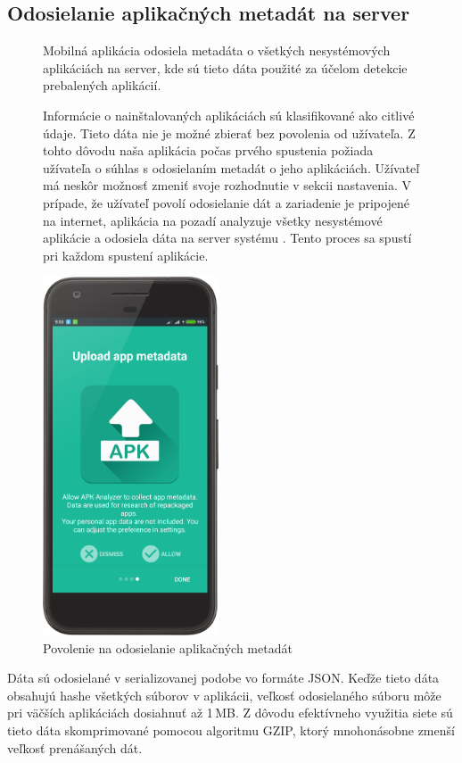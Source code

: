 \subsection{Odosielanie aplikačných metadát na server}
\begin{figure}[H]
\begin{minipage}[t]{0.48\textwidth}
Mobilná aplikácia odosiela metadáta o všetkých nesystémových aplikáciách na server, kde sú tieto dáta použité za účelom detekcie prebalených aplikácií.

Informácie o nainštalovaných aplikáciách sú klasifikované ako citlivé údaje. Tieto dáta nie je možné zbierať bez povolenia od užívateľa. Z tohto dôvodu naša aplikácia počas prvého spustenia požiada užívateľa o súhlas s odosielaním metadát o jeho aplikáciách. Užívateľ má neskôr možnosť zmeniť svoje rozhodnutie v sekcii nastavenia.
V prípade, že užívateľ povolí odosielanie dát a zariadenie je pripojené na internet, aplikácia na pozadí analyzuje všetky nesystémové aplikácie a odosiela dáta na server systému . Tento proces sa spustí pri každom spustení aplikácie.
\end{minipage}%
\hfill
\centering
\begin{minipage}[t][][b]{0.45\textwidth}
\centering
    \includegraphics[width=5.2cm]{images/app/upload_device.png}
\centering
\caption{Povolenie na odosielanie aplikačných metadát}
\label{fig:upload-dialog}
\end{minipage}%
\end{figure}

Dáta sú odosielané v serializovanej podobe vo formáte JSON. Keďže tieto dáta obsahujú hashe všetkých súborov v aplikácii, veľkosť odosielaného súboru môže pri väčších aplikáciách dosiahnuť až 1\,MB. Z dôvodu efektívneho využitia siete sú tieto dáta skomprimované pomocou algoritmu GZIP, ktorý mnohonásobne zmenší veľkosť prenášaných dát.

